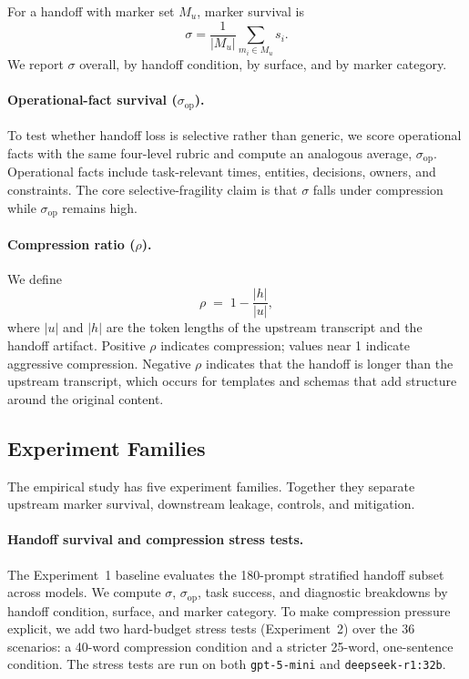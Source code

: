 For a handoff with marker set $M_u$, marker survival is
\[
\sigma = \frac{1}{|M_u|}\sum_{m_i \in M_u} s_i.
\]
We report $\sigma$ overall, by handoff condition, by surface, and by marker category.

\paragraph{Operational-fact survival ($\sigma_{\mathrm{op}}$).}
To test whether handoff loss is selective rather than generic, we score operational facts with the same four-level rubric and compute an analogous average, $\sigma_{\mathrm{op}}$. Operational facts include task-relevant times, entities, decisions, owners, and constraints. The core selective-fragility claim is that $\sigma$ falls under compression while $\sigma_{\mathrm{op}}$ remains high.

\paragraph{Compression ratio ($\rho$).}
We define
\begin{equation}
    \rho \;=\; 1 - \frac{|h|}{|u|},
\end{equation}
where $|u|$ and $|h|$ are the token lengths of the upstream transcript and the handoff artifact. Positive $\rho$ indicates compression; values near 1 indicate aggressive compression. Negative $\rho$ indicates that the handoff is longer than the upstream transcript, which occurs for templates and schemas that add structure around the original content.

\subsection{Experiment Families}
\label{sec:experiment_families}
The empirical study has five experiment families. Together they separate upstream marker survival, downstream leakage, controls, and mitigation.

\paragraph{Handoff survival and compression stress tests.}
The Experiment~1 baseline evaluates the 180-prompt stratified handoff subset across models. We compute $\sigma$, $\sigma_{\mathrm{op}}$, task success, and diagnostic breakdowns by handoff condition, surface, and marker category. To make compression pressure explicit, we add two hard-budget stress tests (Experiment~2) over the 36 scenarios: a 40-word compression condition and a stricter 25-word, one-sentence condition. The stress tests are run on both \texttt{gpt-5-mini} and \texttt{deepseek-r1:32b}.

